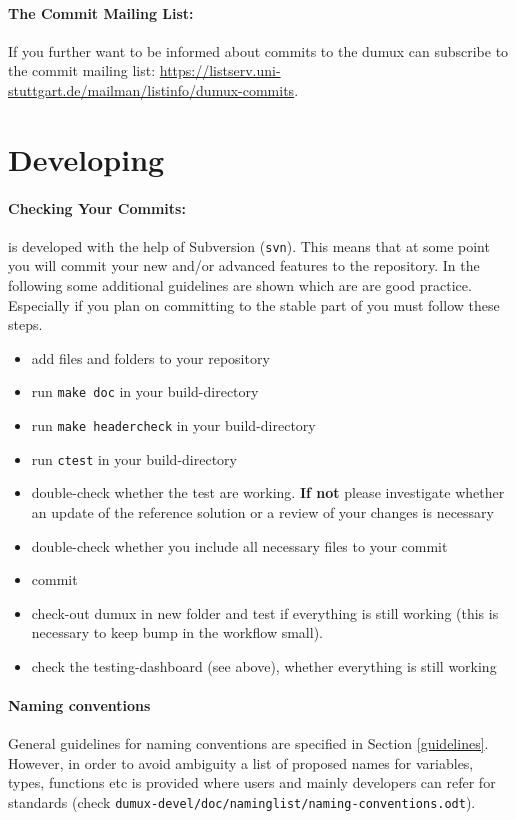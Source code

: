 \paragraph{The Commit Mailing List:}
If you further want to be informed about commits to the dumux can subscribe
to the commit mailing list:
\url{https://listserv.uni-stuttgart.de/mailman/listinfo/dumux-commits}.

\section{Developing \Dumux}
\paragraph{Checking Your Commits:}
\Dumux is developed with the help of Subversion (\texttt{svn}).
This means that at some point you will commit your new and/or advanced features
to the repository. In the following some additional guidelines are shown which are 
are good practice. Especially if you plan on committing to the stable part of
\Dumux you must follow these steps.
\begin{itemize}
  \item add files and folders to your repository
  \item run \texttt{make doc} in your build-directory
  \item run \texttt{make headercheck} in your build-directory
  \item run \texttt{ctest} in your build-directory
  \item double-check whether the test are working. \textbf{If not} please
        investigate whether an update of the reference solution or a review
        of your changes is necessary
  \item double-check whether you include all necessary files to your commit
  \item commit
  \item check-out dumux in new folder and test if everything is still working
        (this is necessary to keep bump in the workflow small).
  \item check the testing-dashboard (see above), whether everything is still working
\end{itemize}

\paragraph{Naming conventions} 
General guidelines for naming conventions are specified in Section \ref{guidelines}.
However, in order to avoid ambiguity a list of proposed names for variables, types,
functions etc is provided where users and mainly \Dumux developers can refer for
standards (check \texttt{dumux-devel/\allowbreak doc/\allowbreak naminglist/\allowbreak naming-conventions.odt}).

